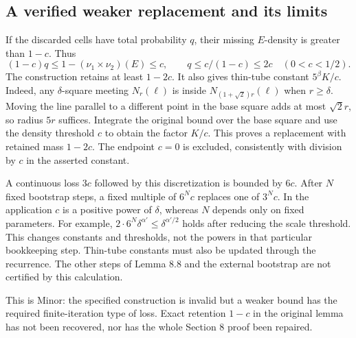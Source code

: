 \documentclass[10pt]{article}
\begin{document}
\subsection*{A verified weaker replacement and its limits}
If the discarded cells have total probability \(q\), their missing \(E\)-density is greater than \(1-c\). Thus \[(1-c)q\le1-(\nu_1\times\nu_2)(E)\le c,\qquad
 q\le c/(1-c)\le2c\quad(0<c<1/2).\] The construction retains at least \(1-2c\). It also gives thin-tube constant \(5^\beta K/c\). Indeed, any \(\delta\)-square meeting \(N_r(\ell)\) is inside \(N_{(1+\sqrt2)r}(\ell)\) when \(r\ge\delta\). Moving the line parallel to a different point in the base square adds at most \(\sqrt2r\), so radius \(5r\) suffices. Integrate the original bound over the base square and use the density threshold \(c\) to obtain the factor \(K/c\). This proves a replacement with retained mass \(1-2c\). The endpoint \(c=0\) is excluded, consistently with division by \(c\) in the asserted constant.\par
A continuous loss \(3c\) followed by this discretization is bounded by \(6c\). After \(N\) fixed bootstrap steps, a fixed multiple of \(6^Nc\) replaces one of \(3^Nc\). In the application \(c\) is a positive power of \(\delta\), whereas \(N\) depends only on fixed parameters. For example, \(2\cdot6^N\delta^{\alpha'}\le\delta^{\alpha'/2}\) holds after reducing the scale threshold. This changes constants and thresholds, not the powers in that particular bookkeeping step. Thin-tube constants must also be updated through the recurrence. The other steps of Lemma 8.8 and the external bootstrap are not certified by this calculation.\par
This is Minor: the specified construction is invalid but a weaker bound has the required finite-iteration type of loss. Exact retention \(1-c\) in the original lemma has not been recovered, nor has the whole Section 8 proof been repaired.\par
\end{document}
